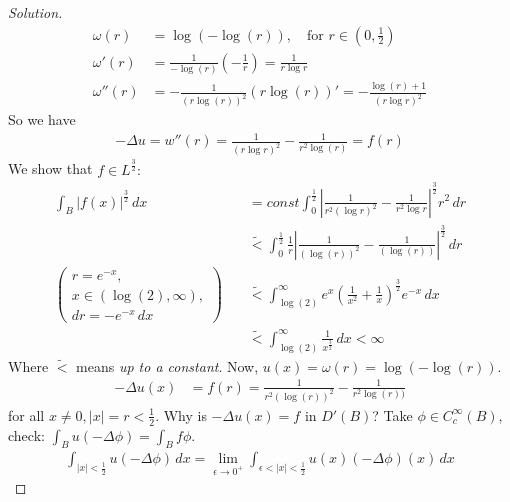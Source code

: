\documentclass{report}
\theoremstyle{tommy}
\begin{document}
  \begin{proof}[Solution]
    \begin{align*}
      \omega(r) &= \log(-\log(r)), \quad \text{for } r \in \left(0, \frac{1}{2}\right) \\
      \omega'(r) &= \frac{1}{- \log(r)} \left(- \frac{1}{r}\right) = \frac{1}{r \log{r}} \\
      \omega''(r) &= - \frac{1}{(r \log(r))^2}(r \log(r))' = - \frac{\log(r)+1}{(r \log r)^2}
    \end{align*}
    So we have 
    \begin{align*}
      - \Delta u = w''(r) = \frac{1}{(r \log r)^2} - \frac{1}{r^2 \log(r)} = f(r)
    \end{align*}
    We show that \(f \in L^{\frac{3}{2}}: \) 
    \begin{align*}
      \int_B |f(x)|^{\frac{3}{2}} \, dx 
      &= const \int_0^{\frac{1}{2}} \left| \frac{1}{r^2 (\log r)^2} - \frac{1}{r^2 \log{r}} \right|^{\frac{3}{2}} r^2 \, dr \\
      &\tilde < \int_0^{\frac{1}{2}} \frac{1}{r} \left| \frac{1}{(\log(r))^2} - \frac{1}{(\log(r))} \right|^{\frac{3}{2}} \, dr \\
      \left(\begin{aligned}
        r = e^{-x}, \\
        x \in (\log(2), \infty), \\
        dr = -e^{-x} \, dx
      \end{aligned}\right) \quad &\tilde < \int_{\log(2)}^\infty e^x \left(\frac{1}{x^2} + \frac{1}{x}\right)^{\frac{3}{2}} e^{-x} \, dx \\
      &\tilde < \int_{\log(2)}^\infty \frac{1}{x^{\frac{3}{2}}} \, dx < \infty
    \end{align*}
    Where \(\tilde <\) means \emph{up to a constant}. Now, \(u(x) = \omega(r) = \log(-\log(r))\). 
    \begin{align*}
      - \Delta u(x) &= f(r) = \frac{1}{r^2(\log(r))^2} - \frac{1}{r^2\log(r))}
    \end{align*}
    for all \(x \ne 0, |x| = r < \frac{1}{2}\). Why is \(- \Delta u(x) = f\) in \(D'(B)\)? Take \(\phi \in C_c^\infty(B)\), check: \(\int_B u(-\Delta \phi) = \int_B f \phi\). 
    \begin{align*}
      \int_{|x| < \frac{1}{2}} u (- \Delta \phi) \, dx = \lim_{\epsilon \to 0^+} \int_{\epsilon < |x| < \frac{1}{2}} u(x) (- \Delta \phi)(x) \, dx

\end{align*}
\end{proof}
\end{document}
